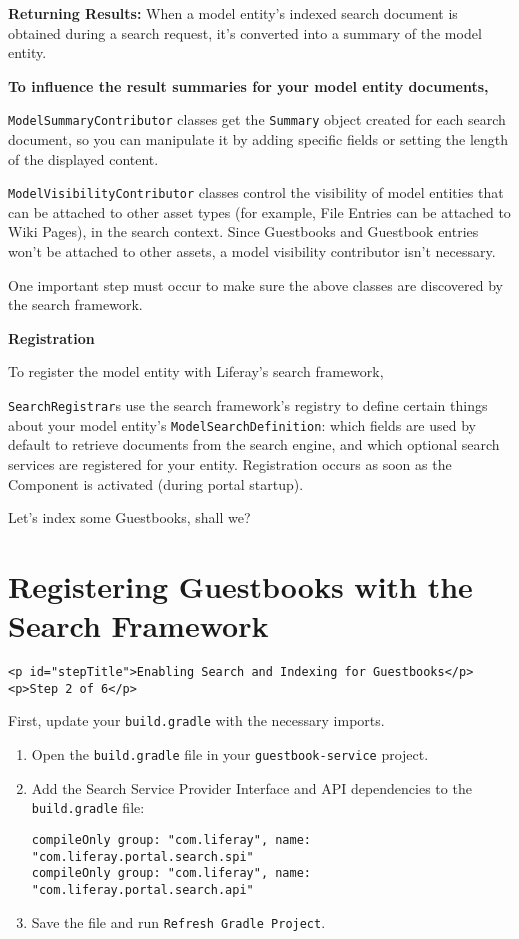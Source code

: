 \textbf{Returning Results:} When a model entity's indexed search
document is obtained during a search request, it's converted into a
summary of the model entity.

\textbf{To influence the result summaries for your model entity
documents,}

\texttt{ModelSummaryContributor} classes get the \texttt{Summary} object
created for each search document, so you can manipulate it by adding
specific fields or setting the length of the displayed content.

\texttt{ModelVisibilityContributor} classes control the visibility of
model entities that can be attached to other asset types (for example,
File Entries can be attached to Wiki Pages), in the search context.
Since Guestbooks and Guestbook entries won't be attached to other
assets, a model visibility contributor isn't necessary.

One important step must occur to make sure the above classes are
discovered by the search framework.

\textbf{Registration}

To register the model entity with Liferay's search framework,

\texttt{SearchRegistrar}s use the search framework's registry to define
certain things about your model entity's \texttt{ModelSearchDefinition}:
which fields are used by default to retrieve documents from the search
engine, and which optional search services are registered for your
entity. Registration occurs as soon as the Component is activated
(during portal startup).

Let's index some Guestbooks, shall we?

\chapter{Registering Guestbooks with the Search
Framework}\label{registering-guestbooks-with-the-search-framework}

\begin{verbatim}
<p id="stepTitle">Enabling Search and Indexing for Guestbooks</p><p>Step 2 of 6</p>
\end{verbatim}

First, update your \texttt{build.gradle} with the necessary imports.

\begin{enumerate}
\def\labelenumi{\arabic{enumi}.}
\item
  Open the \texttt{build.gradle} file in your \texttt{guestbook-service}
  project.
\item
  Add the Search Service Provider Interface and API dependencies to the
  \texttt{build.gradle} file:

\begin{verbatim}
compileOnly group: "com.liferay", name: "com.liferay.portal.search.spi"
compileOnly group: "com.liferay", name: "com.liferay.portal.search.api"
\end{verbatim}
\item
  Save the file and run \texttt{Refresh\ Gradle\ Project}.
\end{enumerate}

